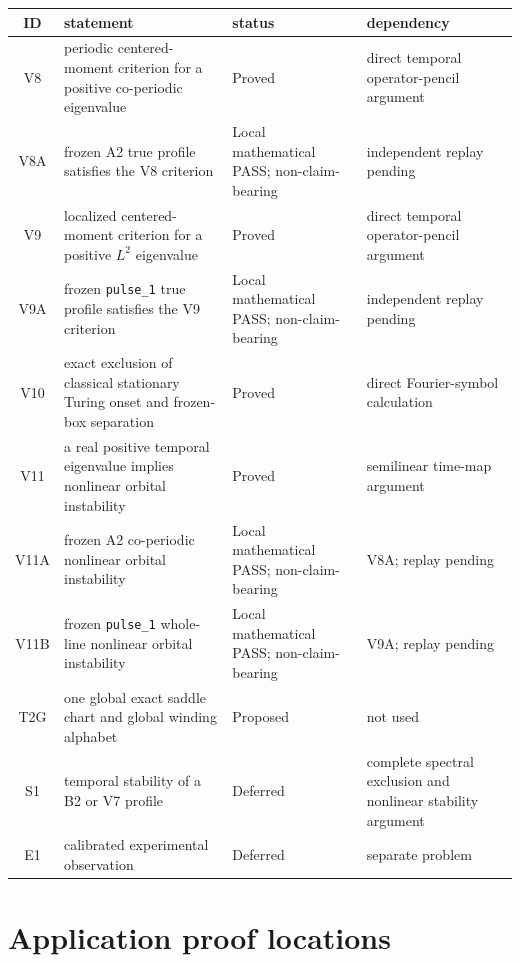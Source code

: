 \documentclass[11pt,reqno]{amsart}
\begin{document}
\begin{center}
\small
\begin{tabular}{@{}c|p{4.8cm}|p{2.1cm}|p{2.9cm}@{}}
 ID & statement & status & dependency \\
 \hline
 V8 & periodic centered-moment criterion for a positive co-periodic eigenvalue
    & Proved & direct temporal operator-pencil argument \\
 V8A & frozen A2 true profile satisfies the V8 criterion
    & Local mathematical PASS; non-claim-bearing & independent replay pending \\
 V9 & localized centered-moment criterion for a positive $L^2$ eigenvalue
    & Proved & direct temporal operator-pencil argument \\
 V9A & frozen \texttt{pulse\_1} true profile satisfies the V9 criterion
    & Local mathematical PASS; non-claim-bearing & independent replay pending \\
 V10 & exact exclusion of classical stationary Turing onset and frozen-box
        separation
    & Proved & direct Fourier-symbol calculation \\
 V11 & a real positive temporal eigenvalue implies nonlinear orbital instability
    & Proved & semilinear time-map argument \\
 V11A & frozen A2 co-periodic nonlinear orbital instability
    & Local mathematical PASS; non-claim-bearing & V8A; replay pending \\
 V11B & frozen \texttt{pulse\_1} whole-line nonlinear orbital instability
    & Local mathematical PASS; non-claim-bearing & V9A; replay pending \\
 T2G & one global exact saddle chart and global winding alphabet
    & Proposed & not used \\
 S1 & temporal stability of a B2 or V7 profile
    & Deferred & complete spectral exclusion and nonlinear stability argument \\
 E1 & calibrated experimental observation
    & Deferred & separate problem
\end{tabular}
\end{center}

\section{Application proof locations}
\end{document}
